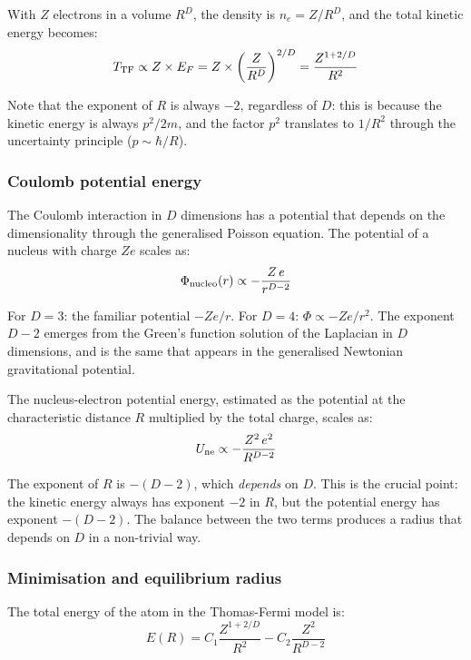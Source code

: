 \documentclass[10pt,a4paper]{article}
\begin{document}
With $Z$ electrons in a volume $R^D$, the density is $n_e = Z/R^D$, and the total kinetic energy becomes:
\begin{equation}
T_{\rm TF} \propto Z \times E_F = Z \times \left(\frac{Z}{R^D}\right)^{2/D} = \frac{Z^{1+2/D}}{R^2}
\end{equation}

Note that the exponent of $R$ is always $-2$, regardless of $D$: this is because the kinetic energy is always $p^2/2m$, and the factor $p^2$ translates to $1/R^2$ through the uncertainty principle ($p \sim \hbar/R$).

\subsubsection{Coulomb potential energy}

The Coulomb interaction in $D$ dimensions has a potential that depends on the dimensionality through the generalised Poisson equation. The potential of a nucleus with charge $Ze$ scales as:
\begin{equation}
\Phi_{\rm nucleo}(r) \propto -\frac{Z\,e}{r^{D-2}}
\end{equation}

For $D = 3$: the familiar potential $-Ze/r$. For $D = 4$: $\Phi \propto -Ze/r^2$. The exponent $D-2$ emerges from the Green's function solution of the Laplacian in $D$ dimensions, and is the same that appears in the generalised Newtonian gravitational potential.

The nucleus-electron potential energy, estimated as the potential at the characteristic distance $R$ multiplied by the total charge, scales as:
\begin{equation}
U_{\rm ne} \propto -\frac{Z^2\,e^2}{R^{D-2}}
\end{equation}

The exponent of $R$ is $-(D-2)$, which \textit{depends} on $D$. This is the crucial point: the kinetic energy always has exponent $-2$ in $R$, but the potential energy has exponent $-(D-2)$. The balance between the two terms produces a radius that depends on $D$ in a non-trivial way.

\subsubsection{Minimisation and equilibrium radius}

The total energy of the atom in the Thomas-Fermi model is:
\begin{equation}
E(R) = C_1 \frac{Z^{1+2/D}}{R^2} - C_2 \frac{Z^2}{R^{D-2}}
\end{equation}
\end{document}
